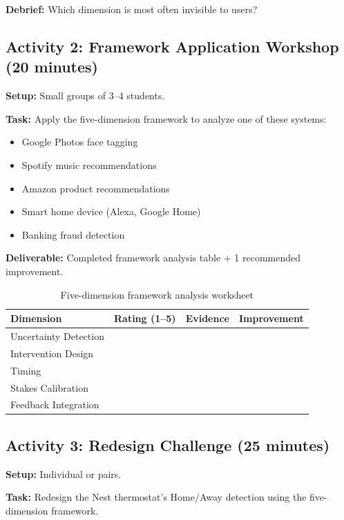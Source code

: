 \textbf{Debrief:} Which dimension is most often invisible to users?

\subsection{Activity 2: Framework Application Workshop (20 minutes)}

\textbf{Setup:} Small groups of 3--4 students.

\textbf{Task:} Apply the five-dimension framework to analyze one of these systems:
\begin{itemize}
    \item Google Photos face tagging
    \item Spotify music recommendations
    \item Amazon product recommendations
    \item Smart home device (Alexa, Google Home)
    \item Banking fraud detection
\end{itemize}

\textbf{Deliverable:} Completed framework analysis table + 1 recommended improvement.

\begin{table}[htbp]
\caption{Five-dimension framework analysis worksheet}
\label{tab:framework-worksheet}
\centering
\begin{tabular}{@{}p{3.5cm}p{2.5cm}p{3cm}p{3cm}@{}}
\toprule
\textbf{Dimension} & \textbf{Rating (1--5)} & \textbf{Evidence} & \textbf{Improvement} \\
\midrule
Uncertainty Detection & & & \\[8pt]
Intervention Design & & & \\[8pt]
Timing & & & \\[8pt]
Stakes Calibration & & & \\[8pt]
Feedback Integration & & & \\
\bottomrule
\end{tabular}
\end{table}

\subsection{Activity 3: Redesign Challenge (25 minutes)}

\textbf{Setup:} Individual or pairs.

\textbf{Task:} Redesign the Nest thermostat's Home/Away detection using the five-dimension framework.

